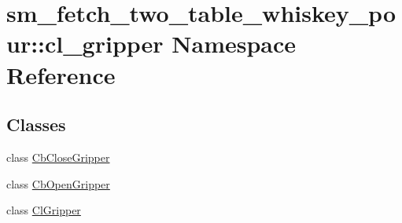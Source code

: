 \hypertarget{namespacesm__fetch__two__table__whiskey__pour_1_1cl__gripper}{}\section{sm\+\_\+fetch\+\_\+two\+\_\+table\+\_\+whiskey\+\_\+pour\+:\+:cl\+\_\+gripper Namespace Reference}
\label{namespacesm__fetch__two__table__whiskey__pour_1_1cl__gripper}
\subsection*{Classes}
\begin{DoxyCompactItemize}
\item 
class \hyperlink{classsm__fetch__two__table__whiskey__pour_1_1cl__gripper_1_1CbCloseGripper}{Cb\+Close\+Gripper}
\item 
class \hyperlink{classsm__fetch__two__table__whiskey__pour_1_1cl__gripper_1_1CbOpenGripper}{Cb\+Open\+Gripper}
\item 
class \hyperlink{classsm__fetch__two__table__whiskey__pour_1_1cl__gripper_1_1ClGripper}{Cl\+Gripper}
\end{DoxyCompactItemize}

